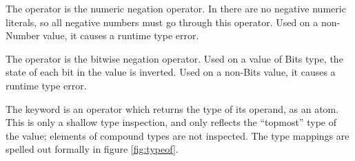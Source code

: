 The operator \op{-} is the numeric negation operator. In \Trilogy{} there are no
negative numeric literals, so all negative numbers must go through this operator.
Used on a non-Number value, it causes a runtime type error.

\begin{prooftree}
\end{prooftree}

The operator \op{\textasciitilde} is the bitwise negation operator. Used on a value
of Bits type, the state of each bit in the value is inverted.
Used on a non-Bits value, it causes a runtime type error.

\begin{prooftree}
\end{prooftree}

The  keyword is an operator which returns the type of its operand, as an
atom. This is only a shallow type inspection, and only reflects the ``topmost'' type
of the value; elements of compound types are not inspected. The type mappings are
spelled out formally in figure \ref{fig:typeof}.

